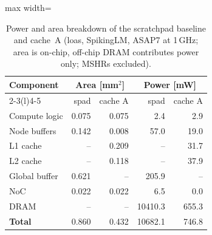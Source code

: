 \begin{table}[t]
    \centering
    \caption{Power and area breakdown of the scratchpad baseline and cache~A (loas, SpikingLM, ASAP7 at 1\,GHz; area is on-chip, off-chip DRAM contributes power only; MSHRs excluded).}
    \label{tab:power-area}
    \begingroup
    \setlength{\tabcolsep}{3pt}
    \renewcommand{\arraystretch}{1.0}
    \small
    \begin{adjustbox}{max width=\columnwidth}
    \begin{tabular}{@{}lrrrr@{}}
        \toprule
        \multirow{2}{*}{\textbf{Component}} & \multicolumn{2}{c}{\textbf{Area [mm$^2$]}} & \multicolumn{2}{c}{\textbf{Power [mW]}} \\
        \cmidrule(lr){2-3}\cmidrule(l){4-5}
        & spad & cache A & spad & cache A \\
        \midrule
        Compute logic & 0.075 & 0.075 & 2.4 & 2.9 \\
        Node buffers & 0.142 & 0.008 & 57.0 & 19.0 \\
        L1 cache & -- & 0.209 & -- & 31.7 \\
        L2 cache & -- & 0.118 & -- & 37.9 \\
        Global buffer & 0.621 & -- & 205.9 & -- \\
        NoC & 0.022 & 0.022 & 6.5 & 0.0 \\
        DRAM & -- & -- & 10410.3 & 655.3 \\
        \midrule
        \textbf{Total} & 0.860 & 0.432 & 10682.1 & 746.8 \\
        \bottomrule
    \end{tabular}
    \end{adjustbox}
    \endgroup
\end{table}
